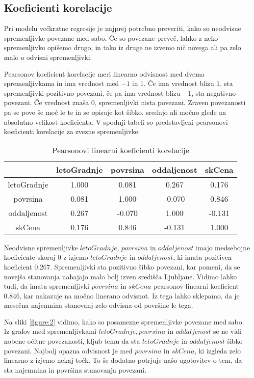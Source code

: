 \documentclass[a4paper, 12pt]{article}
\begin{document}
\subsection{Koeficienti korelacije}

Pri modelu večkratne regresije je najprej potrebno preveriti, kako so
neodvisne spremenljivke povezane med sabo. Če so povezane preveč, lahko z neko
spremenljivko opišemo drugo, in tako iz druge ne izvemo nič novega ali pa zelo
malo o odvisni spremenljivki.

Pearsonov koeficient korelacije meri linearno odvisnost med dvema
spremenljivkama in ima vrednost med $ -1 $ in $ 1 $. Če ima vrednost blizu
$ 1 $, sta spremenljivki pozitivno povezani, če pa ima vrednost blizu $ -1 $,
sta negativno povezani. Če vrednost znaša $ 0 $, spremenljivki nista
povezani. Zraven povezanosti pa se pove še moč le te in se opisuje kot šibko,
srednjo ali močno glede na absolutno velikost koeficienta.
V spodnji tabeli so predstavljeni pearsonovi koeficienti korelacije za zvezne
spremenljivke:
\begin{table}[H]
\begin{center}
\caption{Pearsonovi linearni koeficienti korelacije}
\begin{tabular}{ c|cccc }
	& letoGradnje & povrsina & oddaljenost & skCena \\
	\hline
	letoGradnje & 1.000 & 0.081 & 0.267 & 0.176 \\
	povrsina & 0.081 & 1.000 & -0.070 & 0.846 \\
	oddaljenost & 0.267 & -0.070 & 1.000 & -0.131 \\
	skCena & 0.176 & 0.846 & -0.131 & 1.000 \\
\end{tabular}
\end{center}
\end{table}

Neodvisne spremenljivke $ letoGradnje $, $ povrsina $ in
$ oddaljenost $ imajo medsebojne koeficiente skoraj $ 0 $ z izjemo
$ letoGradnje $ in $ oddaljenost $, ki imata pozitiven koeficient
$ 0.267 $. Spremenljivki sta pozitivno šibko povezani, kar pomeni, da se
novejša stanovanja nahajajo malo bolj izven središča Ljubljane. Vidimo lahko
tudi, da imata spremenljivki $ povrsina $ in $ skCena $ pearsonov linearni
koeficient $ 0.846 $, kar nakazuje na močno linerano odvisnot. Iz tega lahko
sklepamo, da je mesečna najemnina stanovanj zelo odvisna od površine le tega.

Na sliki \ref{figure:2} vidimo, kako so posamezne spremenljivke povezane med
sabo. Iz grafov med spremenljivkami $ letoGradnje, povrsina $ in $ oddaljenost $
se ne vidi nobene očitne povezanosti, kljub temu da sta $ letoGradnje $ in
$ oddaljenost $ šibko povezani. Najbolj opazna odvisnost je med $ povrsina $ in
$ skCena $, ki izgleda zelo linearno z izjemo nekaj točk. To še dodatno
potrjuje našo ugotovitev o tem, da sta najemnina in površina stanovanja
povezani.
\end{document}
